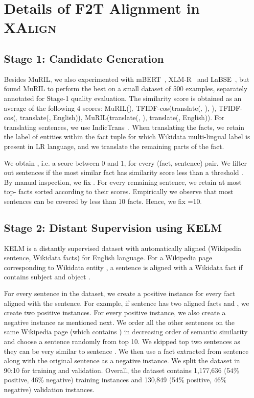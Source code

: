 \documentclass[11pt]{article}
\begin{document}
\section{Details of F2T Alignment in \textsc{XAlign}}
\subsection{Stage 1: Candidate Generation}
Besides MuRIL, we also experimented with mBERT~\cite{devlin2019bert}, XLM-R~\cite{conneau2020unsupervised} and LaBSE~\cite{feng2020language}, but found MuRIL to perform the best on a small dataset of 500 examples, separately annotated for Stage-1 quality evaluation. The similarity score  is  obtained as an average of the following 4 scores: MuRIL(), TFIDF-cos(translate(, ), ), TFIDF-cos(, translate(, English)), MuRIL(translate(, ), translate(, English)). For translating sentences, we use IndicTrans~\cite{ramesh2021samanantar}. When translating the facts, we retain the label of entities within the fact tuple for which Wikidata multi-lingual label is present in LR language, and we translate the remaining parts of the fact. 

We obtain , i.e. a score between 0 and 1, for every (fact, sentence) pair. We filter out sentences if the most similar fact has similarity score less than a threshold . By manual inspection, we fix . For every remaining sentence, we retain at most top- facts sorted according to their scores. Empirically we observe that most sentences can be covered by less than 10 facts. Hence, we fix =10. 

\subsection{Stage 2: Distant Supervision using KELM}
KELM is a distantly supervised dataset with automatically aligned (Wikipedia sentence, Wikidata facts) for English language. For a Wikipedia page corresponding to Wikidata entity , a sentence  is aligned with a Wikidata fact  if  contains subject  and object .  

For every sentence in the dataset, we create a positive instance for every fact aligned with the sentence. For example, if sentence  has two aligned facts  and , we create two positive instances. For every positive instance, we also create a negative instance as mentioned next. We order all the other sentences on the same Wikipedia page (which contains ) in decreasing order of semantic similarity and choose a sentence  randomly from top 10. We skipped top two sentences as they can be very similar to sentence . We then use a fact extracted from sentence  along with the original sentence  as a negative instance. We split the dataset in 90:10 for training and validation. Overall, the dataset contains 1,177,636 (54\% positive, 46\% negative) training instances and 130,849 (54\% positive, 46\% negative) validation instances.
\end{document}
